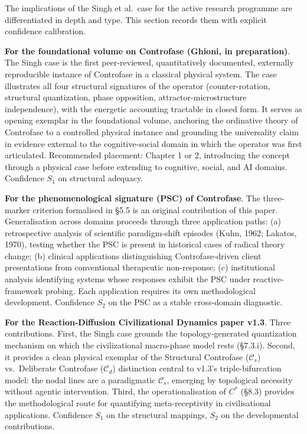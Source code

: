 \documentclass[
  11pt,
  a4paper,
]{article}
\begin{document}
The implications of the Singh et al.~case for the active research
programme are differentiated in depth and type. This section records
them with explicit confidence calibration.

\textbf{For the foundational volume on Controfase (Ghioni, in
preparation)}. The Singh case is the first peer-reviewed, quantitatively
documented, externally reproducible instance of Controfase in a
classical physical system. The case illustrates all four structural
signatures of the operator (counter-rotation, structural quantization,
phase opposition, attractor-microstructure independence), with the
energetic accounting tractable in closed form. It serves as opening
exemplar in the foundational volume, anchoring the ordinative theory of
Controfase to a controlled physical instance and grounding the
universality claim in evidence external to the cognitive-social domain
in which the operator was first articulated. Recommended placement:
Chapter 1 or 2, introducing the concept through a physical case before
extending to cognitive, social, and AI domains. Confidence \(S_1\) on
structural adequacy.

\textbf{For the phenomenological signature (PSC) of Controfase}. The
three-marker criterion formalised in §5.5 is an original contribution of
this paper. Generalisation across domains proceeds through three
application paths: (a) retrospective analysis of scientific
paradigm-shift episodes (Kuhn, 1962; Lakatos, 1970), testing whether the
PSC is present in historical cases of radical theory change; (b)
clinical applications distinguishing Controfase-driven client
presentations from conventional therapeutic non-response; (c)
institutional analysis identifying systems whose responses exhibit the
PSC under reactive-framework probing. Each application requires its own
methodological development. Confidence \(S_2\) on the PSC as a stable
cross-domain diagnostic.

\textbf{For the Reaction-Diffusion Civilizational Dynamics paper v1.3}.
Three contributions. First, the Singh case grounds the
topology-generated quantization mechanism on which the civilizational
macro-phase model rests (§7.3.i). Second, it provides a clean physical
exemplar of the Structural Controfase (\(\mathcal{C}_s\)) vs.~Deliberate
Controfase (\(\mathcal{C}_d\)) distinction central to v1.3's
triple-bifurcation model: the nodal lines are a paradigmatic
\(\mathcal{C}_s\), emerging by topological necessity without agentic
intervention. Third, the operationalisation of \(C^*\) (§8.3) provides
the methodological route for quantifying meta-receptivity in
civilisational applications. Confidence \(S_1\) on the structural
mappings, \(S_2\) on the developmental contributions.
\end{document}
